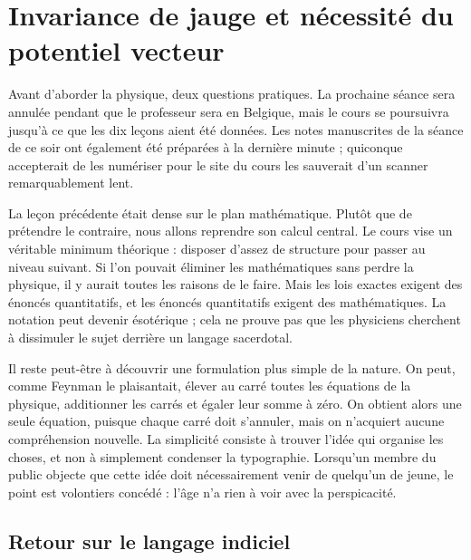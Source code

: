 \chapter{Invariance de jauge et nécessité du potentiel vecteur}

Avant d’aborder la physique, deux questions pratiques. La prochaine séance sera annulée pendant que le professeur sera en Belgique, mais le cours se poursuivra jusqu’à ce que les dix leçons aient été données. Les notes manuscrites de la séance de ce soir ont également été préparées à la dernière minute ; quiconque accepterait de les numériser pour le site du cours les sauverait d’un scanner remarquablement lent.

La leçon précédente était dense sur le plan mathématique. Plutôt que de prétendre le contraire, nous allons reprendre son calcul central. Le cours vise un véritable minimum théorique : disposer d’assez de structure pour passer au niveau suivant. Si l’on pouvait éliminer les mathématiques sans perdre la physique, il y aurait toutes les raisons de le faire. Mais les lois exactes exigent des énoncés quantitatifs, et les énoncés quantitatifs exigent des mathématiques. La notation peut devenir ésotérique ; cela ne prouve pas que les physiciens cherchent à dissimuler le sujet derrière un langage sacerdotal.

Il reste peut-être à découvrir une formulation plus simple de la nature. On peut, comme Feynman le plaisantait, élever au carré toutes les équations de la physique, additionner les carrés et égaler leur somme à zéro. On obtient alors une seule équation, puisque chaque carré doit s’annuler, mais on n’acquiert aucune compréhension nouvelle. La simplicité consiste à trouver l’idée qui organise les choses, et non à simplement condenser la typographie. Lorsqu’un membre du public objecte que cette idée doit nécessairement venir de quelqu’un de jeune, le point est volontiers concédé : l’âge n’a rien à voir avec la perspicacité.


\section{Retour sur le langage indiciel}

